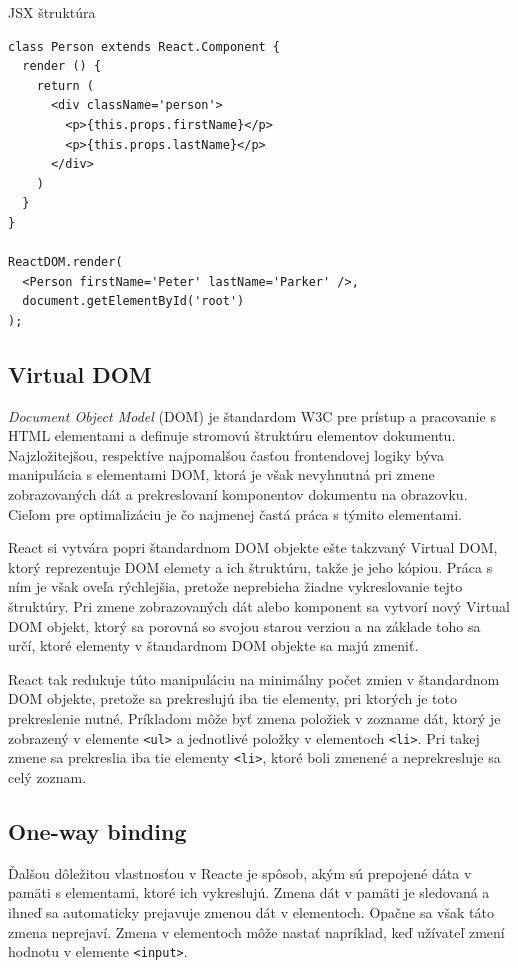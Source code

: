 \documentclass[
  digital, %
  table,   %
  lof,     %
  lot,     %
]{fithesis3}
\begin{document}
\begin{exmp}
JSX štruktúra
\centering
\begin{lstlisting}[basicstyle=\small]
class Person extends React.Component {
  render () {
    return (
      <div className='person'>
        <p>{this.props.firstName}</p>
        <p>{this.props.lastName}</p>
      </div>
    )
  }
}

ReactDOM.render(
  <Person firstName='Peter' lastName='Parker' />,
  document.getElementById('root')
);
\end{lstlisting}
\end{exmp}

\subsection{Virtual DOM}
\textit{Document Object Model} (DOM) je štandardom W3C pre prístup a pracovanie s HTML elementami a definuje stromovú štruktúru elementov dokumentu. Najzložitejšou, respektíve najpomalšou časťou frontendovej logiky býva manipulácia s elementami DOM, ktorá je však nevyhnutná pri zmene zobrazovaných dát a prekreslovaní komponentov dokumentu na obrazovku. Cieľom pre optimalizáciu je čo najmenej častá práca s týmito elementami.

React si vytvára popri štandardnom DOM objekte ešte takzvaný Virtual DOM, ktorý reprezentuje DOM elemety a ich štruktúru, takže je jeho kópiou. Práca s ním je však oveľa rýchlejšia, pretože neprebieha žiadne vykreslovanie tejto štruktúry. Pri zmene zobrazovaných dát alebo komponent sa vytvorí nový Virtual DOM objekt, ktorý sa porovná so svojou starou verziou a na základe toho sa určí, ktoré elementy v štandardnom DOM objekte sa majú zmeniť.

React tak redukuje túto manipuláciu na minimálny počet zmien v štandardnom DOM objekte, pretože sa prekreslujú iba tie elementy, pri ktorých je toto prekreslenie nutné. Príkladom môže byť zmena položiek v zozname dát, ktorý je zobrazený v elemente \texttt{<ul>} a jednotlivé položky v elementoch \texttt{<li>}. Pri takej zmene sa prekreslia iba tie elementy \texttt{<li>}, ktoré boli zmenené a neprekresluje sa celý zoznam.

\subsection{One-way binding}
Ďalšou dôležitou vlastnosťou v Reacte je spôsob, akým sú prepojené dáta v pamäti s elementami, ktoré ich vykreslujú. Zmena dát v pamäti je sledovaná a ihneď sa automaticky prejavuje zmenou dát v elementoch. Opačne sa však táto zmena neprejaví. Zmena v elementoch môže nastať napríklad, keď užívateľ zmení hodnotu v elemente \texttt{<input>}.
\end{document}
